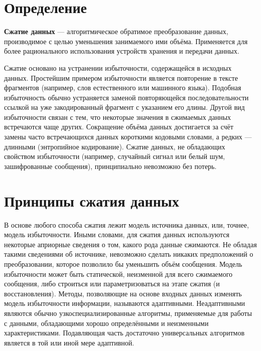\documentclass[a4paper]{report}
\begin{document}
\section{Определение}
\textbf{Сжатие данных} — алгоритмическое обратимое преобразование данных, производимое с целью уменьшения занимаемого ими объёма. Применяется для более рационального использования устройств хранения и передачи данных.
\par Сжатие основано на устранении избыточности, содержащейся в исходных данных. Простейшим примером избыточности является повторение в тексте фрагментов (например, слов естественного или машинного языка). Подобная избыточность обычно устраняется заменой повторяющейся последовательности ссылкой на уже закодированный фрагмент с указанием его длины. Другой вид избыточности связан с тем, что некоторые значения в сжимаемых данных встречаются чаще других. Сокращение объёма данных достигается за счёт замены часто встречающихся данных короткими кодовыми словами, а редких — длинными (энтропийное кодирование). Сжатие данных, не обладающих свойством избыточности (например, случайный сигнал или белый шум, зашифрованные сообщения), принципиально невозможно без потерь.
\section{Принципы сжатия данных}
В основе любого способа сжатия лежит модель источника данных, или, точнее, модель избыточности. Иными словами, для сжатия данных используются некоторые априорные сведения о том, какого рода данные сжимаются. Не обладая такими сведениями об источнике, невозможно сделать никаких предположений о преобразовании, которое позволило бы уменьшить объём сообщения. Модель избыточности может быть статической, неизменной для всего сжимаемого сообщения, либо строиться или параметризоваться на этапе сжатия (и восстановления). Методы, позволяющие на основе входных данных изменять модель избыточности информации, называются адаптивными. Неадаптивными являются обычно узкоспециализированные алгоритмы, применяемые для работы с данными, обладающими хорошо определёнными и неизменными характеристиками. Подавляющая часть достаточно универсальных алгоритмов является в той или иной мере адаптивной.
\end{document}
